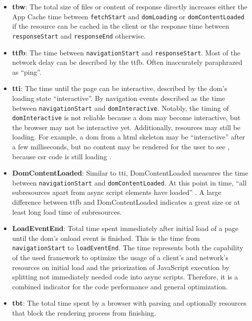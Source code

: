 \documentclass[a4paper, 12pt]{article}
\begin{document}
\begin{itemize}
  \item \textbf{\acrfull{tbw}}: The total size of files or content of response directly increases either the App Cache time between \verb|fetchStart| and \verb|domLoading| or \verb|domContentLoaded| if the resource can be cached in the client or the response time between \verb|responseStart| and \verb|responseEnd| otherwise.
  \item \textbf{\acrfull{ttfb}}: The time between \verb|navigationStart| and \verb|responseStart|.
  Most of the network delay can be described by the \acrshort{ttfb}.
  Often inaccurately paraphrazed as \enquote{ping}.
  \item \textbf{\acrfull{tti}}: The time until the page can be interactive, described by the \acrshort{dom}'s loading state \enquote{interactive}.
  By navigation events described as the time between \verb|navigationStart| and \verb|domInteractive|.
  Notably, the timing of \verb|domInteractive| is not reliable because a \acrshort{dom} may become interactive, but the browser may not be interactive yet.
  Additionally, resources may still be loading.
  For example, a \acrshort{dom} from a \acrshort{html} skeleton may be \enquote{interactive} after a few milliseconds, but no content may be rendered for the user to see \citep{htmlLivingStandard}, because \acrshort{csr} code is still loading \citep{htmlLivingStandard}.
  \item \textbf{DomContentLoaded}: Similar to \acrshort{tti}, DomContentLoaded measures the time between \verb|navigationStart| and \verb|domContentLoaded|.
  At this point in time, \enquote{all subresources apart from async script elements have loaded} \citep{htmlLivingStandard}.
  A large difference between \acrshort{ttfb} and DomContentLoaded indicates a great size or at least long load time of subresources.
  \item \textbf{LoadEventEnd}: Total time spent immediately after initial load of a page until the \acrshort{dom}'s onload event is finished.
  This is the time from \\
  \verb|navigationStart| to \verb|loadEventEnd|.
  The time represents both the capability of the used framework to optimize the usage of a client's and network's resources on initial load and the priorization of JavaScript execution by splitting not immediately needed code into async scripts.
  Therefore, it is a combined indicator for the code performance and general optimization.
  \item \textbf{\acrfull{tbt}}: The total time spent by a browser with parsing and optionally resources that block the rendering process from finishing.

\end{itemize}
\end{document}
